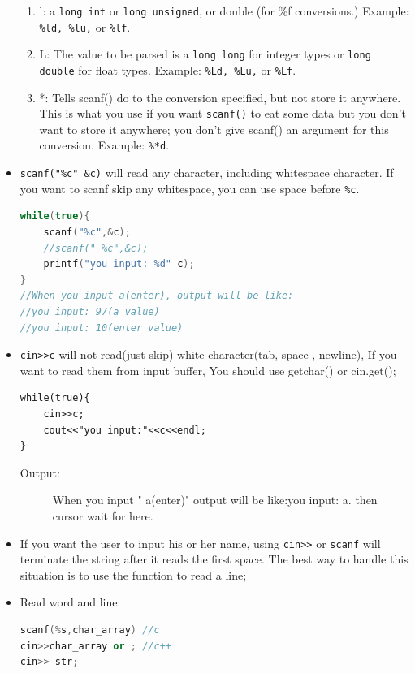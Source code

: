 \documentclass[a4paper,11pt,twoside]{book}
\begin{document}
\begin{itemize}
\begin{enumerate}
		\item l:  a \texttt{long int} or \texttt{long unsigned}, or double (for \%f conversions.) Example: \texttt{\%ld, \%lu,} or \texttt{\%lf}.
		
		\item L: The value to be parsed is a \texttt{long long} for integer types or \texttt{long double} for float types. Example: \texttt{\%Ld, \%Lu,} or \texttt{\%Lf}.
		
		\item *: Tells scanf() do to the conversion specified, but not store it anywhere. This is what you use if you want \texttt{scanf()} to eat some data but you don't want to store it anywhere; you don't give scanf() an argument for this conversion. Example: \texttt{\%*d}.
	\end{enumerate}
	
	
	\item \texttt{scanf("\%c" \&c)} will read any character, including whitespace character. If you want to scanf skip any whitespace, you can use space before \texttt{\%c}.
	
\begin{lstlisting}[frame=single, language=c++, mathescape=true]
while(true){
	scanf("%c",&c);
	//scanf(" %c",&c);
	printf("you input: %d" c);
}
//When you input a(enter), output will be like:
//you input: 97(a value)
//you input: 10(enter value)
\end{lstlisting}

	\item \verb=cin>>c= will not read(just skip) white character(tab, space , newline), If you want to read them from input buffer, You should use getchar() or cin.get(); 
\begin{lstlisting}
while(true){
	cin>>c;
	cout<<"you input:"<<c<<endl;
}
	\end{lstlisting}
	\begin{description}
		\item[Output:] When you input  "    a(enter)"
		output will be like:you input:  a. then cursor wait for here.
	\end{description}
	
	\item If you want the user to input his or her name, using \verb=cin>>= or \texttt{scanf} will terminate the string after it reads the first space. The best way to handle this situation is to use the function to read a line;
	
	\item Read word and line:
\begin{lstlisting}[frame=single, language=c++]
scanf(%s,char_array) //c
cin>>char_array or ; //c++
cin>> str;
	

\end{lstlisting}
\end{itemize}
\end{document}

